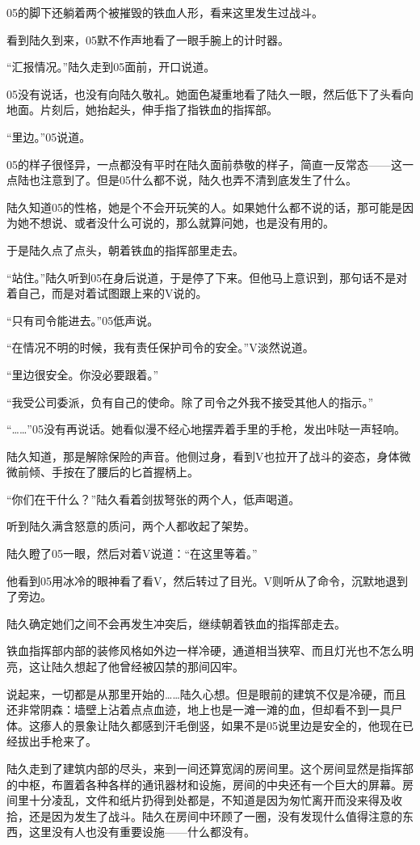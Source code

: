 05的脚下还躺着两个被摧毁的铁血人形，看来这里发生过战斗。

看到陆久到来，05默不作声地看了一眼手腕上的计时器。

“汇报情况。”陆久走到05面前，开口说道。

05没有说话，也没有向陆久敬礼。她面色凝重地看了陆久一眼，然后低下了头看向地面。片刻后，她抬起头，伸手指了指铁血的指挥部。

“里边。”05说道。

05的样子很怪异，一点都没有平时在陆久面前恭敬的样子，简直一反常态——这一点陆也注意到了。但是05什么都不说，陆久也弄不清到底发生了什么。

陆久知道05的性格，她是个不会开玩笑的人。如果她什么都不说的话，那可能是因为她不想说、或者没什么可说的，那么就算问她，也是没有用的。

于是陆久点了点头，朝着铁血的指挥部里走去。

“站住。”陆久听到05在身后说道，于是停了下来。但他马上意识到，那句话不是对着自己，而是对着试图跟上来的V说的。

“只有司令能进去。”05低声说。

“在情况不明的时候，我有责任保护司令的安全。”V淡然说道。

“里边很安全。你没必要跟着。”

“我受公司委派，负有自己的使命。除了司令之外我不接受其他人的指示。”

“……”05没有再说话。她看似漫不经心地摆弄着手里的手枪，发出咔哒一声轻响。

陆久知道，那是解除保险的声音。他侧过身，看到V也拉开了战斗的姿态，身体微微前倾、手按在了腰后的匕首握柄上。

“你们在干什么？”陆久看着剑拔弩张的两个人，低声喝道。

听到陆久满含怒意的质问，两个人都收起了架势。

陆久瞪了05一眼，然后对着V说道：“在这里等着。”

他看到05用冰冷的眼神看了看V，然后转过了目光。V则听从了命令，沉默地退到了旁边。

陆久确定她们之间不会再发生冲突后，继续朝着铁血的指挥部走去。

铁血指挥部内部的装修风格如外边一样冷硬，通道相当狭窄、而且灯光也不怎么明亮，这让陆久想起了他曾经被囚禁的那间囚牢。

说起来，一切都是从那里开始的……陆久心想。但是眼前的建筑不仅是冷硬，而且还非常阴森：墙壁上沾着点点血迹，地上也是一滩一滩的血，但却看不到一具尸体。这瘆人的景象让陆久都感到汗毛倒竖，如果不是05说里边是安全的，他现在已经拔出手枪来了。

陆久走到了建筑内部的尽头，来到一间还算宽阔的房间里。这个房间显然是指挥部的中枢，布置着各种各样的通讯器材和设施，房间的中央还有一个巨大的屏幕。房间里十分凌乱，文件和纸片扔得到处都是，不知道是因为匆忙离开而没来得及收拾，还是因为发生了战斗。陆久在房间中环顾了一圈，没有发现什么值得注意的东西，这里没有人也没有重要设施——什么都没有。

